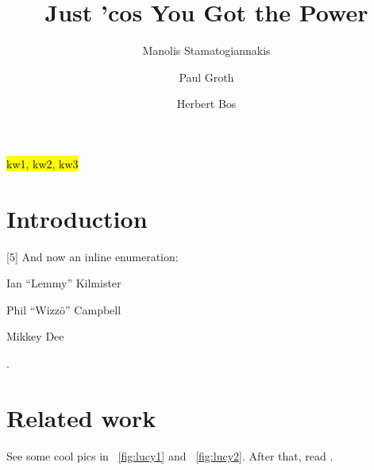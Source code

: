 \documentclass{llncs}
\newcommand{\figref}[1]{\figurename~\ref{#1}\xspace}
\newcommand{\hlc}[2][yellow]{ {\sethlcolor{#1} \hl{#2}} }
\begin{document}

\title{Just 'cos You Got the Power}
\author{Manolis Stamatogiannakis \and Paul Groth \and Herbert Bos}

\maketitle


\begin{abstract}
\blindtext
\end{abstract}

\begin{keywords}\hlc{kw1, kw2, kw3}\end{keywords}


\section{Introduction}
\blindtext[1]
[5]
\blindtext[1]
And now an inline enumeration:
\begin{enumerate*}[label=\itshape\alph*\upshape)]
\item Ian ``Lemmy'' Kilmister
\item Phil ``Wizzö'' Campbell
\item Mikkey Dee
\end{enumerate*}.


\section{Related work}

See some cool pics in \figref{fig:lucy1} and \figref{fig:lucy2}.
After that, read \cite{Stamatogiannakis:BlackBox:IPAW:2014}.
\end{document}
